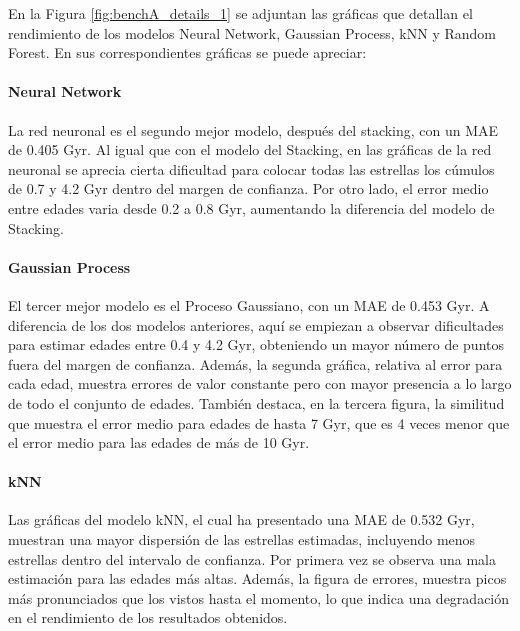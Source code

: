 En la Figura \ref{fig:benchA_details_1} se adjuntan las gráficas que detallan el rendimiento de los modelos Neural Network, Gaussian Process, kNN y Random Forest. En sus correspondientes gráficas se puede apreciar:

\paragraph{Neural Network} 
La red neuronal es el segundo mejor modelo, después del stacking, con un MAE de 0.405 Gyr. Al igual que con el modelo del Stacking, en las gráficas de la red neuronal se aprecia cierta dificultad para colocar todas las estrellas los cúmulos de 0.7 y 4.2 Gyr dentro del margen de confianza. Por otro lado, el error medio entre edades varia desde 0.2 a 0.8 Gyr, aumentando la diferencia del modelo de Stacking.

\paragraph{Gaussian Process} 
El tercer mejor modelo es el Proceso Gaussiano, con un MAE de 0.453 Gyr. A diferencia de los dos modelos anteriores, aquí se empiezan a observar dificultades para estimar edades entre 0.4 y 4.2 Gyr, obteniendo un mayor número de puntos fuera del margen de confianza. Además, la segunda gráfica, relativa al error para cada edad, muestra errores de valor constante pero con mayor presencia a lo largo de todo el conjunto de edades. También destaca, en la tercera figura, la similitud que muestra el error medio para edades de hasta 7 Gyr, que es 4 veces menor que el error medio para las edades de más de 10 Gyr.

\paragraph{kNN} 
Las gráficas del modelo kNN, el cual ha presentado una MAE de 0.532 Gyr, muestran una mayor dispersión de las estrellas estimadas, incluyendo menos estrellas dentro del intervalo de confianza. Por primera vez se observa una mala estimación para las edades más altas. Además, la figura de errores, muestra picos más pronunciados que los vistos hasta el momento, lo que indica una degradación en el rendimiento de los resultados obtenidos.


